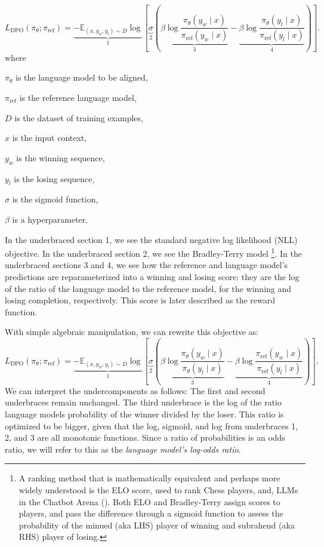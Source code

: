 \documentclass[twoside,11pt]{article}
\begin{document}
\begin{equation}
  \label{eq:dpo}
  L_\mathrm{DPO}(\pi_\theta; \pi_\mathrm{ref}) =
  \underbrace{
  -\mathbb{E}_{(x, y_w, y_l) \sim D} 
  \log }_{1} 
  \left[ 
    \underbrace{\sigma }_{2}
    \left(
    \underbrace{\beta \log \frac{\pi_\theta(y_w \mid x)}{\pi_\mathrm{ref}(y_w \mid x)}}_{3}
    - \underbrace{\beta \log \frac{\pi_\theta(y_l \mid x)}{\pi_\mathrm{ref}(y_l \mid x)}}_{4} 
    \right)
  \right].
\end{equation}
where
\begin{description}
  \item $\pi_\theta$ is the language model to be aligned,
  \item $\pi_\mathrm{ref}$ is the reference language model,
  \item $D$ is the dataset of training examples,
  \item $x$ is the input context,
  \item $y_w$ is the winning sequence,
  \item $y_l$ is the losing sequence,
  \item $\sigma$ is the sigmoid function,
  \item $\beta$ is a hyperparameter.
\end{description}
In the underbraced section 1, we see the standard 
negative log likelihood (NLL) objective.
In the underbraced section 2, we see the Bradley-Terry model 
\footnote{A ranking method that is mathematically equivalent and perhaps more 
widely understood is the ELO score, used to rank Chess players, 
and, LLMs in the Chatbot Arena (\cite{elo1978rating,chiang2024chatbot}). 
Both ELO and Bradley-Terry assign scores to players, and 
pass the difference through a sigmoid function to assess the probability of 
the minued (aka LHS) player of winning and subrahend (aka RHS) player of losing.}.
In the underbraced sections 3 and 4, we see how the 
reference and language model's predictions are reparameterized
into a winning and losing score: they are the 
log of the ratio of the language model to the reference model, for the winning and 
losing completion, respectively. 
This score is later described as the reward function.

With simple algebraic manipulation, we can rewrite this objective as:
\[
  \label{eq:reg}
  L_\mathrm{DPO}(\pi_\theta; \pi_\mathrm{ref}) =
  \underbrace{
  -\mathbb{E}_{(x, y_w, y_l) \sim D} 
  \log }_{1} 
  \left[ 
    \underbrace{\sigma }_{2}
    \left(
    \underbrace{\beta \log \frac{\pi_\theta(y_w \mid x)}{\pi_\theta(y_l \mid x)}}_{3}
    - \underbrace{\beta \log \frac{\pi_\mathrm{ref}(y_w \mid x)}{\pi_\mathrm{ref}(y_l \mid x)}}_{4} 
    \right)
  \right].
\]
We can interpret the undercomponents as follows: 
The first and second underbraces remain unchanged. 
The third underbrace is the log of the ratio
language models probability of the winner divided by the loser. This ratio 
is optimized to be bigger, given that the log, sigmoid, and log from underbraces
1, 2, and 3 are all monotonic functions. Since a ratio of probabilities is
an odds ratio, we will refer to this as the 
\emph{language model's log-odds ratio}. 
\end{document}

